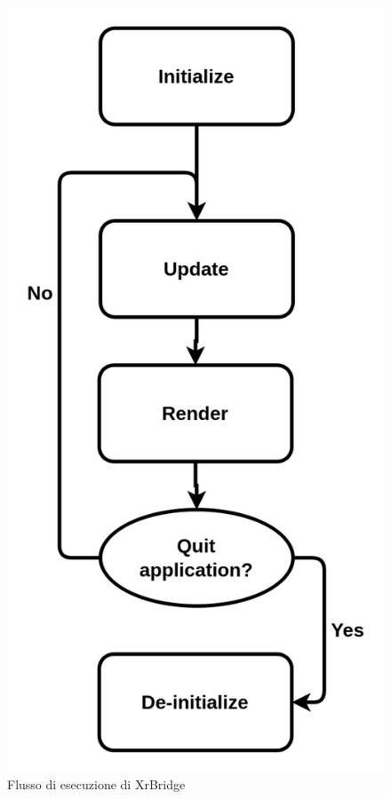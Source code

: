 \documentclass[twoside]{supsistudent}
\begin{document}
\begin{figure}[h]
  \caption{Flusso di esecuzione di XrBridge}
  \centering
  \includegraphics[scale=0.2]{resources/flow.png}
\end{figure}
\end{document}
